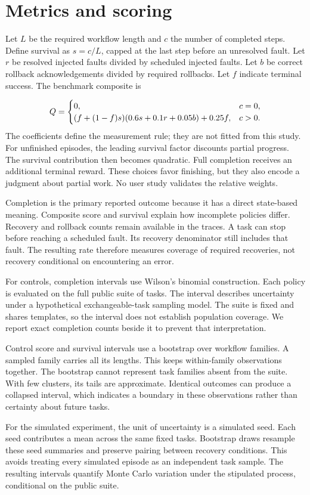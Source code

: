 \documentclass{article}
\begin{document}
\section{Metrics and scoring}
Let $L$ be the required workflow length and $c$ the number of completed steps. Define survival as $s=c/L$, capped at the last step before an unresolved fault. Let $r$ be resolved injected faults divided by scheduled injected faults. Let $b$ be correct rollback acknowledgements divided by required rollbacks. Let $f$ indicate terminal success. The benchmark composite is\par
\begin{equation}\label{eq:score}
Q=\begin{cases}0,&c=0,\\
(f+(1-f)s)(0.6s+0.1r+0.05b)+0.25f,&c>0.\par
\end{cases}
\end{equation}
The coefficients define the measurement rule; they are not fitted from this study. For unfinished episodes, the leading survival factor discounts partial progress. The survival contribution then becomes quadratic. Full completion receives an additional terminal reward. These choices favor finishing, but they also encode a judgment about partial work. No user study validates the relative weights.\par
Completion is the primary reported outcome because it has a direct state-based meaning. Composite score and survival explain how incomplete policies differ. Recovery and rollback counts remain available in the traces. A task can stop before reaching a scheduled fault. Its recovery denominator still includes that fault. The resulting rate therefore measures coverage of required recoveries, not recovery conditional on encountering an error.\par
For controls, completion intervals use Wilson's binomial construction. Each policy is evaluated on the full public suite of \TaskCount{} tasks. The interval describes uncertainty under a hypothetical exchangeable-task sampling model. The suite is fixed and shares templates, so the interval does not establish population coverage. We report exact completion counts beside it to prevent that interpretation.\par
Control score and survival intervals use a bootstrap over workflow families. A sampled family carries all its lengths. This keeps within-family observations together. The bootstrap cannot represent task families absent from the suite. With few clusters, its tails are approximate. Identical outcomes can produce a collapsed interval, which indicates a boundary in these observations rather than certainty about future tasks.\par
For the simulated experiment, the unit of uncertainty is a simulated seed. Each seed contributes a mean across the same fixed tasks. Bootstrap draws resample these seed summaries and preserve pairing between recovery conditions. This avoids treating every simulated episode as an independent task sample. The resulting intervals quantify Monte Carlo variation under the stipulated process, conditional on the public suite.\par
\end{document}

